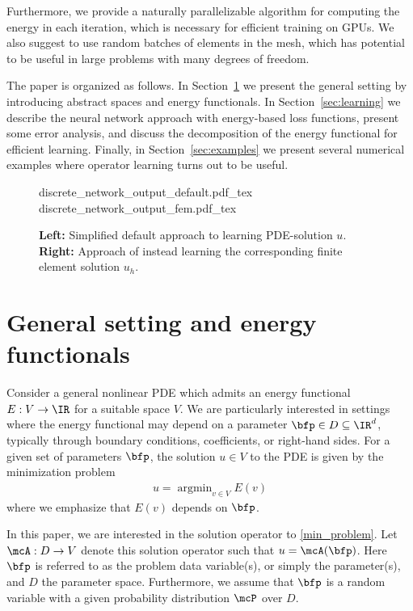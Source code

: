 \documentclass[12pt]{article}
\DeclareMathOperator*{\argmin}{\arg\min}
\begin{document}
Furthermore, we provide a naturally parallelizable algorithm for computing the energy in each iteration, which is necessary for efficient training on GPUs. We also suggest to use random batches of elements in the mesh, which has potential to be useful in large problems with many degrees of freedom.

The paper is organized as follows. In Section~\ref{sec:general} we present the general setting by introducing abstract spaces and energy functionals. In Section~\ref{sec:learning} we describe the neural network approach with energy-based loss functions, present some error analysis, and discuss the decomposition of the energy functional for efficient learning. Finally, in Section~\ref{sec:examples} we present several numerical examples where operator learning turns out to be useful.

\begin{figure}
\centering
\def\svgwidth{0.49\textwidth}
{discrete_network_output_default.pdf_tex}
\def\svgwidth{0.49\textwidth}
{discrete_network_output_fem.pdf_tex}
\caption{\textbf{Left:} Simplified default approach to learning PDE-solution $u$. \textbf{Right:} Approach of instead learning the corresponding finite element solution $u_h$.}
\label{fig_discnetout_deffem}
\end{figure}

\section{General setting and energy functionals}\label{sec:general}
Consider a general nonlinear PDE which admits an energy functional $E: V \to \IR$ for a suitable space $V$. We are particularly interested in settings where the energy functional may depend on a parameter $\bfp \in D \subseteq \IR^d$, typically through boundary conditions, coefficients, or right-hand sides. For a given set of parameters $\bfp$, the solution $u \in V$ to the PDE is given by the minimization problem
\begin{align}
	u = \argmin_{v \in V} E(v) \label{min_problem}
\end{align}
where we emphasize that $E(v)$ depends on $\bfp$.

In this paper, we are interested in the solution operator to \eqref{min_problem}. Let $\mcA:D \to V$ denote this solution operator such that $u=\mcA(\bfp)$. Here $\bfp$ is referred to as the problem data variable(s), or simply the parameter(s), and $D$ the parameter space. Furthermore, we assume that $\bfp$ is a random variable with a given probability distribution $\mcP$ over $D$.
\end{document}
